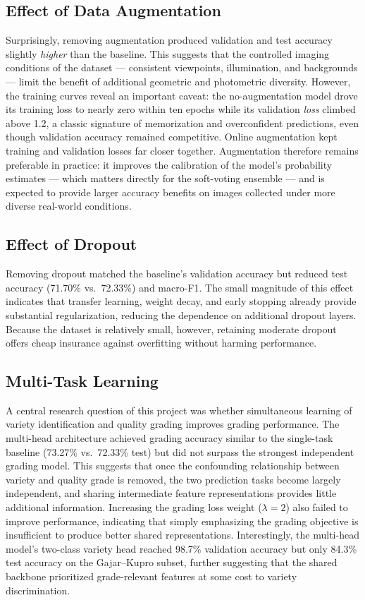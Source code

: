 \documentclass[conference]{IEEEtran}
\begin{document}
\subsection{Effect of Data Augmentation}
Surprisingly, removing augmentation produced validation and test accuracy slightly \emph{higher} than the baseline. This suggests that the controlled imaging conditions of the dataset --- consistent viewpoints, illumination, and backgrounds --- limit the benefit of additional geometric and photometric diversity. However, the training curves reveal an important caveat: the no-augmentation model drove its training loss to nearly zero within ten epochs while its validation \emph{loss} climbed above 1.2, a classic signature of memorization and overconfident predictions, even though validation accuracy remained competitive. Online augmentation kept training and validation losses far closer together. Augmentation therefore remains preferable in practice: it improves the calibration of the model's probability estimates --- which matters directly for the soft-voting ensemble --- and is expected to provide larger accuracy benefits on images collected under more diverse real-world conditions.

\subsection{Effect of Dropout}
Removing dropout matched the baseline's validation accuracy but reduced test accuracy (71.70\% vs.\ 72.33\%) and macro-F1. The small magnitude of this effect indicates that transfer learning, weight decay, and early stopping already provide substantial regularization, reducing the dependence on additional dropout layers. Because the dataset is relatively small, however, retaining moderate dropout offers cheap insurance against overfitting without harming performance.

\subsection{Multi-Task Learning}
A central research question of this project was whether simultaneous learning of variety identification and quality grading improves grading performance. The multi-head architecture achieved grading accuracy similar to the single-task baseline (73.27\% vs.\ 72.33\% test) but did not surpass the strongest independent grading model. This suggests that once the confounding relationship between variety and quality grade is removed, the two prediction tasks become largely independent, and sharing intermediate feature representations provides little additional information. Increasing the grading loss weight ($\lambda=2$) also failed to improve performance, indicating that simply emphasizing the grading objective is insufficient to produce better shared representations. Interestingly, the multi-head model's two-class variety head reached 98.7\% validation accuracy but only 84.3\% test accuracy on the Gajar--Kupro subset, further suggesting that the shared backbone prioritized grade-relevant features at some cost to variety discrimination.
\end{document}

